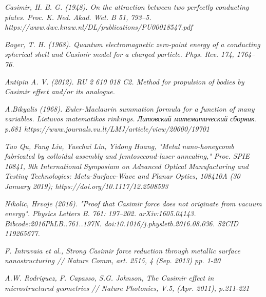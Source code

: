 \documentclass[11pt]{article}
\begin{document}
    \begin{thebibliography}{99}

\textit{Casimir, H. B. G. (1948). On the attraction between two perfectly conducting plates. Proc. K. Ned. Akad. Wet. B 51, 793–5.
https://www.dwc.knaw.nl/DL/publications/PU00018547.pdf}

\textit{Boyer, T. H. (1968). Quantum electromagnetic zero-point energy of a conducting spherical shell and Casimir model for a charged particle. Phys. Rev. 174, 1764–76.}

\textit{Antipin A. V. (2012). RU 2 610 018 C2. Method for propulsion of bodies by Casimir effect and/or its analogue.}

\textit{A.Bikyalis (1968). Euler-Maclaurin summation formula for a function of many variables.  Lietuvos matematikos rinkinys. Литовский математический сборник. p.681
https://www.journals.vu.lt/LMJ/article/view/20600/19701}

\textit{Tuo Qu, Fang Liu, Yuechai Lin, Yidong Huang, "Metal nano-honeycomb fabricated by colloidal assembly and femtosecond-laser annealing," Proc. SPIE 10841, 9th International Symposium on Advanced Optical Manufacturing and Testing Technologies: Meta-Surface-Wave and Planar Optics, 108410A (30 January 2019); https://doi.org/10.1117/12.2508593}

\textit{Nikolic, Hrvoje (2016). "Proof that Casimir force does not originate from vacuum energy". Physics Letters B. 761: 197–202. arXiv:1605.04143. Bibcode:2016PhLB..761..197N. doi:10.1016/j.physletb.2016.08.036. S2CID 119265677.}

\textit{F. Intravaia et al., Strong Casimir force reduction through metallic surface nanostructuring // Nature Comm, art. 2515, 4 (Sep. 2013) pp. 1-20}

\textit{A.W. Rodriguez, F. Capasso, S.G. Johnson, The Casimir effect in microstructured geometries // Nature Photonics, V.5, (Apr. 2011), p.211-221}

\end{thebibliography}


    
    
    
\end{document}
